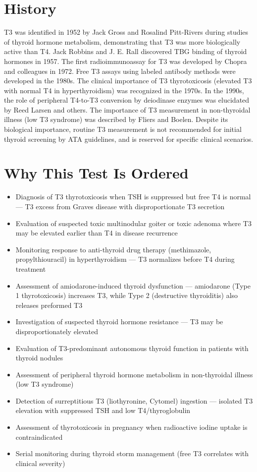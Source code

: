 \section*{History}
T3 was identified in 1952 by Jack Gross and Rosalind Pitt-Rivers during studies of thyroid hormone metabolism, demonstrating that T3 was more biologically active than T4. Jack Robbins and J. E. Rall discovered TBG binding of thyroid hormones in 1957. The first radioimmunoassay for T3 was developed by Chopra and colleagues in 1972. Free T3 assays using labeled antibody methods were developed in the 1980s. The clinical importance of T3 thyrotoxicosis (elevated T3 with normal T4 in hyperthyroidism) was recognized in the 1970s. In the 1990s, the role of peripheral T4-to-T3 conversion by deiodinase enzymes was elucidated by Reed Larsen and others. The importance of T3 measurement in non-thyroidal illness (low T3 syndrome) was described by Fliers and Boelen. Despite its biological importance, routine T3 measurement is not recommended for initial thyroid screening by ATA guidelines, and is reserved for specific clinical scenarios.

\section*{Why This Test Is Ordered}
\begin{itemize}
  \item Diagnosis of T3 thyrotoxicosis when TSH is suppressed but free T4 is normal --- T3 excess from Graves disease with disproportionate T3 secretion
  \item Evaluation of suspected toxic multinodular goiter or toxic adenoma where T3 may be elevated earlier than T4 in disease recurrence
  \item Monitoring response to anti-thyroid drug therapy (methimazole, propylthiouracil) in hyperthyroidism --- T3 normalizes before T4 during treatment
  \item Assessment of amiodarone-induced thyroid dysfunction --- amiodarone (Type 1 thyrotoxicosis) increases T3, while Type 2 (destructive thyroiditis) also releases preformed T3
  \item Investigation of suspected thyroid hormone resistance --- T3 may be disproportionately elevated
  \item Evaluation of T3-predominant autonomous thyroid function in patients with thyroid nodules
  \item Assessment of peripheral thyroid hormone metabolism in non-thyroidal illness (low T3 syndrome)
  \item Detection of surreptitious T3 (liothyronine, Cytomel) ingestion --- isolated T3 elevation with suppressed TSH and low T4/thyroglobulin
  \item Assessment of thyrotoxicosis in pregnancy when radioactive iodine uptake is contraindicated
  \item Serial monitoring during thyroid storm management (free T3 correlates with clinical severity)
\end{itemize}

